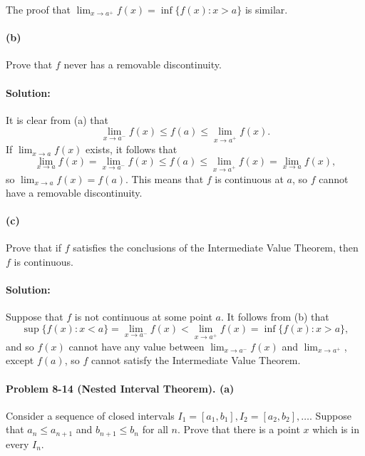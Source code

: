 \documentclass{article}
\begin{document}
The proof that $\lim_{x \rightarrow a^+}f(x) = \inf\{f(x): x > a\}$ is similar.

\paragraph{(b)} Prove that $f$ never has a removable discontinuity.

\paragraph{Solution:} It is clear from (a) that \begin{equation*}
  \lim_{x \rightarrow a^-}f(x) \leq f(a) \leq \lim_{x \rightarrow a^+}f(x).
\end{equation*}
If $\lim_{x \rightarrow a}f(x)$ exists, it follows that \begin{equation*}
  \lim_{x \rightarrow a}f(x) = \lim_{x \rightarrow a^-}f(x) \leq f(a) \leq
    \lim_{x \rightarrow a^+}f(x) = \lim_{x \rightarrow a}f(x),
\end{equation*} so $\lim_{x \rightarrow a}f(x) = f(a)$. This means that $f$ is
continuous at $a$, so $f$ cannot have a removable discontinuity.

\paragraph{(c)} Prove that if $f$ satisfies the conclusions of the Intermediate
Value Theorem, then $f$ is continuous.

\paragraph{Solution:} Suppose that $f$ is not continuous at some point $a$. It
follows from (b) that \begin{equation*}
  \sup\{f(x): x < a\} = \lim_{x \rightarrow a^-}f(x) < \lim_{x \rightarrow a^+}
    f(x) = \inf\{f(x): x > a\},
\end{equation*} and so $f(x)$ cannot have any value between $\lim_{x
\rightarrow a^-}f(x)$ and $\lim_{x \rightarrow a^+}$, except $f(a)$, so $f$
cannot satisfy the Intermediate Value Theorem.

\paragraph{Problem 8-14 (Nested Interval Theorem). (a)} Consider a sequence of
closed intervals $I_1 = [a_1, b_1], I_2 = [a_2, b_2], \ldots$. Suppose that
$a_n \leq a_{n+1}$ and $b_{n+1} \leq b_n$ for all $n$. Prove that there is a
point $x$ which is in every $I_n$.
\end{document}
